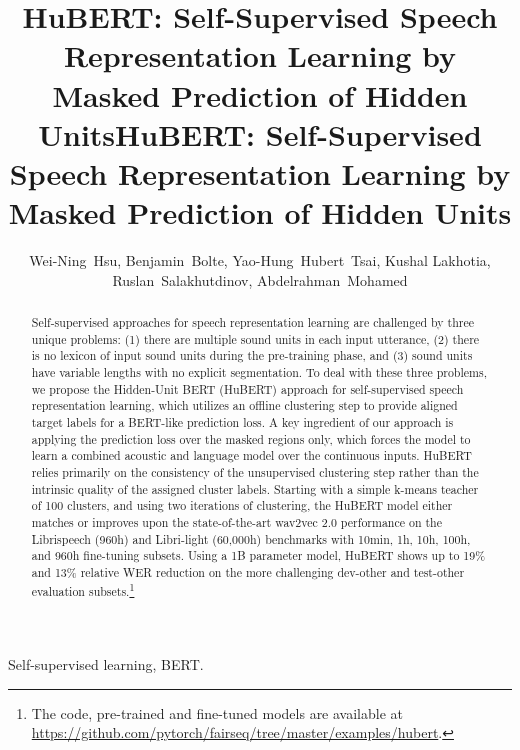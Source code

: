 \title{HuBERT: Self-Supervised Speech Representation Learning by Masked Prediction of Hidden Units}



\title{HuBERT: Self-Supervised Speech Representation Learning by Masked Prediction of Hidden Units}
\author{Wei-Ning~Hsu,
        Benjamin~Bolte,
        Yao-Hung~Hubert~Tsai,
        Kushal Lakhotia,
        \\Ruslan~Salakhutdinov,
        Abdelrahman~Mohamed}

\maketitle

\begin{abstract}
Self-supervised approaches for speech representation learning are challenged by three unique problems: (1) there are multiple sound units in each input utterance, (2) there is no lexicon of input sound units during the pre-training phase, and (3) sound units have variable lengths with no explicit segmentation. To deal with these three problems, we propose the Hidden-Unit BERT (HuBERT) approach for self-supervised speech representation learning, which utilizes an offline clustering step to provide aligned target labels for a BERT-like prediction loss. A key ingredient of our approach is applying the prediction loss over the masked regions only, which forces the model to learn a combined acoustic and language model over the continuous inputs. HuBERT relies primarily on the consistency of the unsupervised clustering step rather than the intrinsic quality of the assigned cluster labels. Starting with a simple k-means teacher of 100 clusters, and using two iterations of clustering, the HuBERT model either matches or improves upon the state-of-the-art wav2vec 2.0 performance on the Librispeech (960h) and Libri-light (60,000h) benchmarks with 10min, 1h, 10h, 100h, and 960h fine-tuning subsets. Using a 1B parameter model, HuBERT shows up to 19\% and 13\% relative WER reduction on the more challenging dev-other and test-other evaluation subsets.\footnote{The code, pre-trained and fine-tuned models are available at \url{https://github.com/pytorch/fairseq/tree/master/examples/hubert}.}
\end{abstract}

\begin{IEEEkeywords}
Self-supervised learning, BERT.
\end{IEEEkeywords}

\IEEEpeerreviewmaketitle


